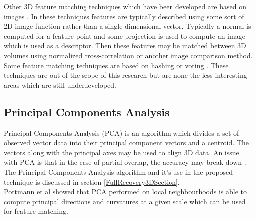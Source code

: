 Other 3D feature matching techniques which have been developed are based on images \cite{Wolfson97Geometric,Johnson97Spin}. In these techniques features are typically described using some sort of 2D image function rather than a single dimensional vector. Typically a normal is computed for a feature point and some projection is used to compute an image which is used as a descriptor. Then these features may be matched between 3D volumes using normalized cross-correlation or another image comparison method.  \\

Some feature matching techniques are based on hashing or voting \cite{Germain97Fingerprint,Gal06Salient,Mitra04Registration,Ballard91Generalizing}. These techniques are out of the scope of this research but are none the less interesting areas which are still underdeveloped.


\subsection{Principal Components Analysis}

Principal Components Analysis (PCA) is an algorithm which divides a set of observed vector data into their principal component vectors and a centroid. The vectors along with the principal axes may be used to align 3D data. An issue with PCA is that in the case of partial overlap, the accuracy may break down \cite{Aiger084}. The Principal Components Analysis algorithm and it's use in the proposed technique is discussed in section \ref{FullRecovery3DSection}. \\

Pottmann et al \cite{Pottmann07Principal} showed that PCA performed on local neighbourhoods is able to compute principal directions and curvatures at a given scale which can be used for feature matching. \\





